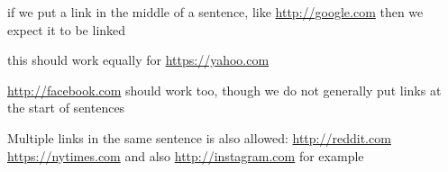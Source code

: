 
if we put a link in the middle of a sentence, like \url{http://google.com} then we expect it to be linked

this should work equally for \url{https://yahoo.com}

\url{http://facebook.com} should work too, though we do not generally put links at the start of sentences

Multiple links in the same sentence is also allowed: \url{http://reddit.com} \url{https://nytimes.com} and also \url{http://instagram.com} for example

